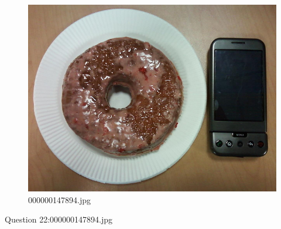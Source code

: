     \begin{figure}[h]
        \centering
        \includegraphics[width=0.8\linewidth]{../image set/easy/000000147894.jpg}
        \caption{000000147894.jpg}
    \end{figure}
    Question 22:000000147894.jpg

